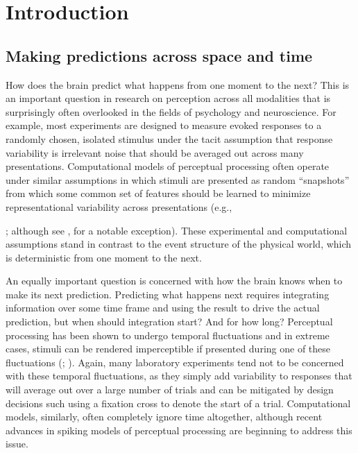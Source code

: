 \documentclass[dwyatte_dissertation.tex]{subfiles}
\begin{document}
\chapter{Introduction}
\label{chap:intro}

\section{Making predictions across space and time}
How does the brain predict what happens from one moment to the next? This is an important question in research on perception across all modalities that is surprisingly often overlooked in the fields of psychology and neuroscience. For example, most experiments are designed to measure evoked responses to a randomly chosen, isolated stimulus under the tacit assumption that response variability is irrelevant noise that should be averaged out across many presentations. Computational models of perceptual processing often operate under similar assumptions in which stimuli are presented as random ``snapshots'' from which some common set of features should be learned to minimize representational variability across presentations (e.g., {; although see , for a notable exception). These experimental and computational assumptions stand in contrast to the event structure of the physical world, which is deterministic from one moment to the next. 

An equally important question is concerned with how the brain knows when to make its next prediction. Predicting what happens next requires integrating information over some time frame and using the result to drive the actual prediction, but when should integration start? And for how long? Perceptual processing has been shown to undergo temporal fluctuations and in extreme cases, stimuli can be rendered imperceptible if presented during one of these fluctuations (; ). Again, many laboratory experiments tend not to be concerned with these temporal fluctuations, as they simply add variability to responses that will average out over a large number of trials and can be mitigated by design decisions such using a fixation cross to denote the start of a trial. Computational models, similarly, often completely ignore time altogether, although recent advances in spiking models of perceptual processing \cite[e.g.,]{MasquelierThorpe07} are beginning to address this issue.

}
\end{document}
